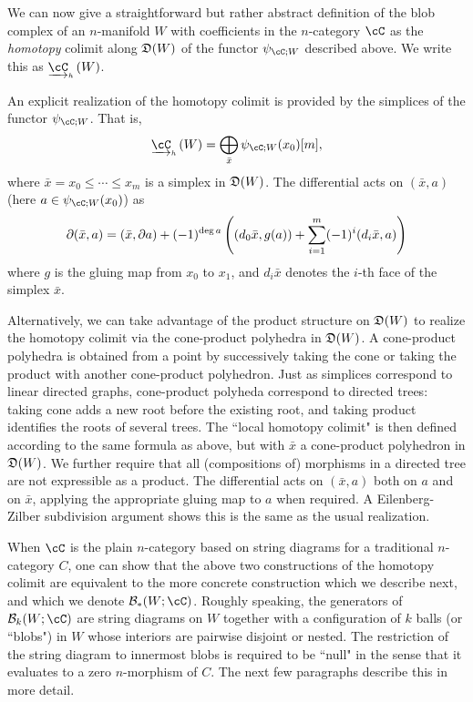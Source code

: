 \documentclass{pnastwo}
\begin{document}
\begin{article}
We can now give a straightforward but rather abstract definition of the blob complex of an $n$-manifold $W$
with coefficients in the $n$-category $\cC$ as the {\it homotopy} colimit along $\mathfrak{D}(W)$
of the functor $\psi_{\cC; W}$ described above. We write this as $\clh{\cC}(W)$.

An explicit realization of the homotopy colimit is provided by the simplices of the 
functor $\psi_{\cC; W}$. That is, $$\clh{\cC}(W) = \DirectSum_{\bar{x}} \psi_{\cC; W}(x_0)[m],$$ 
where $\bar{x} = x_0 \leq \cdots \leq x_m$ is a simplex in $\mathfrak{D}(W)$. 
The differential acts on $(\bar{x},a)$ (here $a \in \psi_{\cC; W}(x_0)$) as
$$\partial (\bar{x},a) = (\bar{x}, \partial a) + (-1)^{\deg a} \left( (d_0 \bar{x}, g(a)) + \sum_{i=1}^m (-1)^i (d_i \bar{x}, a) \right)$$
where $g$ is the gluing map from $x_0$ to $x_1$, and $d_i \bar{x}$ denotes the $i$-th face of the simplex $\bar{x}$.

Alternatively, we can take advantage of the product structure on $\mathfrak{D}(W)$ to realize the 
homotopy colimit via the cone-product polyhedra in $\mathfrak{D}(W)$. 
A cone-product polyhedra is obtained from a point by successively taking the cone or taking the 
product with another cone-product polyhedron. Just as simplices correspond to linear directed graphs, 
cone-product polyheda correspond to directed trees: taking cone adds a new root before the existing root, 
and taking product identifies the roots of several trees. 
The ``local homotopy colimit" is then defined according to the same formula as above, but with $\bar{x}$ a cone-product polyhedron in $\mathfrak{D}(W)$. 
We further require that all (compositions of) morphisms in a directed tree are not expressible as a product.
The differential acts on $(\bar{x},a)$ both on $a$ and on $\bar{x}$, applying the appropriate gluing map to $a$ when required.
A Eilenberg-Zilber subdivision argument shows this is the same as the usual realization. 

When $\cC$ is the plain $n$-category based on string diagrams for a traditional
$n$-category $C$,
one can show \cite{1009.5025} that the above two constructions of the homotopy colimit
are equivalent to the more concrete construction which we describe next, and which we denote $\bc_*(W; \cC)$.
Roughly speaking, the generators of $\bc_k(W; \cC)$ are string diagrams on $W$ together with
a configuration of $k$ balls (or ``blobs") in $W$ whose interiors are pairwise disjoint or nested.
The restriction of the string diagram to innermost blobs is required to be ``null" in the sense that
it evaluates to a zero $n$-morphism of $C$.
The next few paragraphs describe this in more detail.


\end{article}
\end{document}
